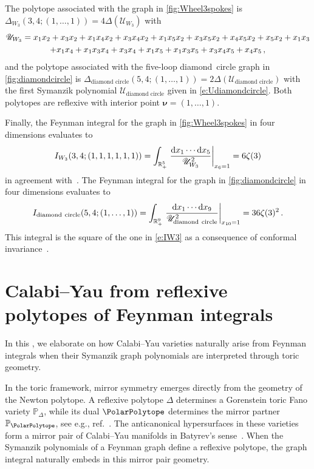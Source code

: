 \documentclass[12pt,a4paper]{article}
\theoremstyle{plain}
\theoremstyle{remark}
\newcommand{\dd}{\mathrm{d}}
\newcommand{\cU}{\mathscr {U}}
\newcommand{\undernotation}[1]{\pmb{#1}}
\newcommand{\Newton}{\Delta}
\begin{document}
The polytope associated with the graph in \cref{fig:Wheel3spokes} is $\Delta_{W_3}(3,4;(1,\dots,1))=4\Newton(\cU_{W_3})$
 with 
  \begin{multline}
  \cU_{W_3}= x_{1} x_{2}+x_{3} x_{2}+x_{1} x_{4} x_{2}+x_{3} x_{4} x_{2}+x_{1} x_{5} x_{2}+x_{3} x_{5}
  x_{2}+x_{4} x_{5} x_{2}+x_{5} x_{2}+x_{1} x_{3}\cr
  +x_{1} x_{4}+x_{1} x_{3} x_{4}+x_{3} x_{4}+x_{1}
   x_{5}+x_{1} x_{3} x_{5}+x_{3} x_{4} x_{5}+x_{4} x_{5}\,,
 \end{multline}
 and the polytope associated with the five-loop diamond~circle graph in \cref{fig:diamondcircle} is 
  $\Delta_{\textrm{diamond~circle}}(5,4;(1,\dots,1))=2\Newton(\cU_{\textrm{diamond~circle}})$  with the first Symanzik polynomial $\cU_{\textrm{diamond~circle}}$  given in \cref{e:Udiamondcircle}. 
  Both polytopes are reflexive with interior point $\undernotation{\nu}=(1,\dots,1)$.

Finally, the Feynman integral for the graph in \cref{fig:Wheel3spokes} in four dimensions evaluates to 
  \begin{equation}\label{e:IW3}
    I_{W_3}(3,4; (1,1,1,1,1,1))=    \int_{\mathbb R_+^5} \left. {\dd x_1\cdots \dd x_5\over \cU_{W_3}^2}\right|_{x_6=1}=6\zeta(3)
\end{equation}
  in agreement with~\cite{Brown:2021umn}.
The Feynman integral for the graph in \cref{fig:diamondcircle} in four dimensions evaluates to
  \begin{equation}
    I_{\rm diamond~circle}(5,4;(1,\dots,1))=\int_{\mathbb R_+^9} \left. {\dd x_1\cdots
      \dd x_{9}\over \cU_{\rm diamond~circle}^2}\right|_{x_{10}=1}=36\zeta(3)^2 \,.   
  \end{equation}
  This integral is the square of the one in \cref{e:IW3} as a consequence of conformal invariance~\cite{Broadhurst:1985tld, Panzer:2019yxl}.





\section{Calabi--Yau from reflexive polytopes of Feynman integrals}\label{sec:mirror}
In this , we elaborate on how Calabi--Yau varieties naturally arise from Feynman integrals when their Symanzik graph polynomials are interpreted through toric geometry.

In the toric framework, mirror symmetry emerges directly from the geometry of the Newton polytope. A reflexive polytope $\Delta$ determines a Gorenstein toric Fano variety $\mathbb P_\Delta$, while its dual $\PolarPolytope$ determines the mirror partner $\mathbb P_{\PolarPolytope}$, see e.g., ref.~\cite{Kasprzyk_2022}. The anticanonical hypersurfaces in these varieties form a mirror pair of Calabi--Yau manifolds in Batyrev's sense~\cite{Batyrev:1993oya}. When the Symanzik polynomials of a Feynman graph  define a reflexive polytope, the graph integral naturally embeds in this mirror pair geometry.
\end{document}
